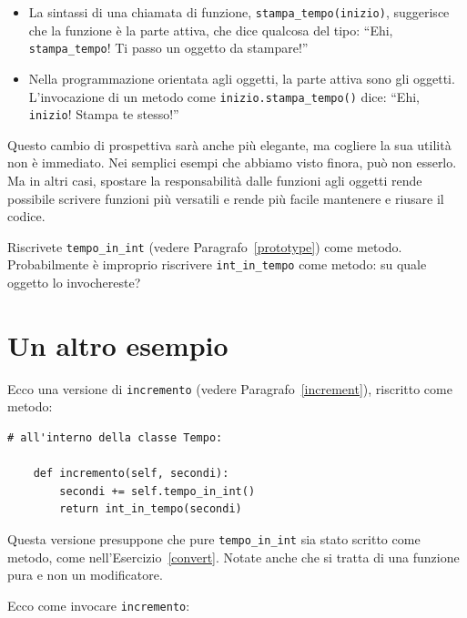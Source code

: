 \documentclass[10pt]{book}
\begin{document}
\begin{itemize}

\item La sintassi di una chiamata di funzione, \verb"stampa_tempo(inizio)",
  suggerisce che la funzione è la parte attiva, che dice qualcosa del tipo: ``Ehi, \verb"stampa_tempo"!  Ti passo un oggetto da stampare!''

\item Nella programmazione orientata agli oggetti, la parte attiva sono gli oggetti.  L'invocazione di un metodo come \verb"inizio.stampa_tempo()" dice:
  ``Ehi, {\tt inizio}!  Stampa te stesso!''

\end{itemize}

Questo cambio di prospettiva sarà anche più elegante, ma cogliere la sua utilità non è immediato. Nei semplici esempi che abbiamo visto finora, può non esserlo. Ma in altri casi, spostare la responsabilità dalle funzioni agli oggetti rende possibile scrivere funzioni più versatili e rende più facile mantenere e riusare il codice.

\vspace{0.2in}
\begin{exercise}
\label{convert}

Riscrivete \verb"tempo_in_int" (vedere Paragrafo~\ref{prototype}) come metodo.
Probabilmente è improprio riscrivere \verb"int_in_tempo" come metodo: su quale oggetto lo invochereste?

\end{exercise}


\section{Un altro esempio}

Ecco una versione di {\tt incremento} (vedere Paragrafo~\ref{increment}),
riscritto come metodo:

\begin{verbatim}
# all'interno della classe Tempo:

    def incremento(self, secondi):
        secondi += self.tempo_in_int()
        return int_in_tempo(secondi)
\end{verbatim}
%
Questa versione presuppone che pure \verb"tempo_in_int" sia stato scritto come metodo, come nell'Esercizio~\ref{convert}.  Notate anche che si tratta di una funzione pura e non un modificatore.

Ecco come invocare {\tt incremento}:
\end{document}
